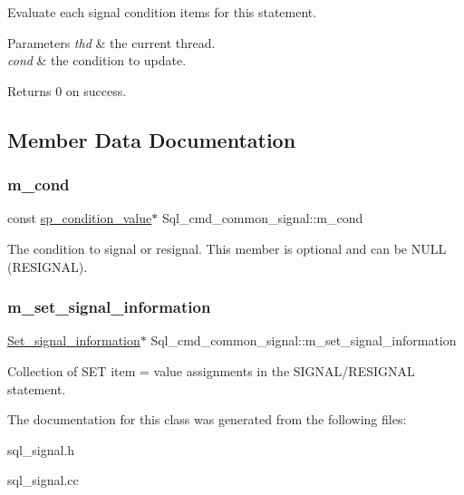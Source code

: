 Evaluate each signal condition items for this statement. 
\begin{DoxyParams}{Parameters}
{\em thd} & the current thread. \\
\hline
{\em cond} & the condition to update. \\
\hline
\end{DoxyParams}
\begin{DoxyReturn}{Returns}
0 on success. 
\end{DoxyReturn}


\subsection{Member Data Documentation}
\mbox{\label{classSql__cmd__common__signal_a5ec928fbd9312027097edd4862af0004}} 
\subsubsection{\texorpdfstring{m\+\_\+cond}{m\_cond}}
{\footnotesize\ttfamily const \mbox{\hyperlink{classsp__condition__value}{sp\+\_\+condition\+\_\+value}}$\ast$ Sql\+\_\+cmd\+\_\+common\+\_\+signal\+::m\+\_\+cond\hspace{0.3cm}{\ttfamily [protected]}}

The condition to signal or resignal. This member is optional and can be N\+U\+LL (R\+E\+S\+I\+G\+N\+AL). \mbox{\label{classSql__cmd__common__signal_a630c5723e27ee3e92be44d723f794465}} 
\subsubsection{\texorpdfstring{m\+\_\+set\+\_\+signal\+\_\+information}{m\_set\_signal\_information}}
{\footnotesize\ttfamily \mbox{\hyperlink{classSet__signal__information}{Set\+\_\+signal\+\_\+information}}$\ast$ Sql\+\_\+cmd\+\_\+common\+\_\+signal\+::m\+\_\+set\+\_\+signal\+\_\+information\hspace{0.3cm}{\ttfamily [protected]}}

Collection of \textquotesingle{}S\+ET item = value\textquotesingle{} assignments in the S\+I\+G\+N\+A\+L/\+R\+E\+S\+I\+G\+N\+AL statement. 

The documentation for this class was generated from the following files\+:\begin{DoxyCompactItemize}
\item 
sql\+\_\+signal.\+h\item 
sql\+\_\+signal.\+cc\end{DoxyCompactItemize}
